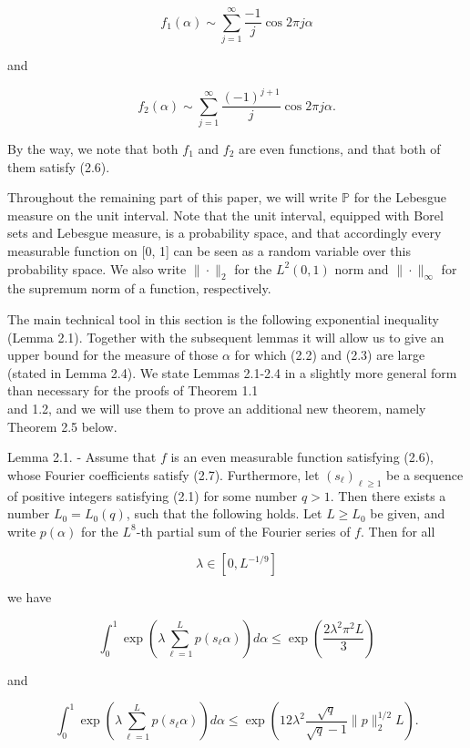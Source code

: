 \documentclass[10pt]{article}
\begin{document}
$$
f_{1}(\alpha) \sim \sum_{j=1}^{\infty} \frac{-1}{j} \cos 2 \pi j \alpha
$$

and

$$
f_{2}(\alpha) \sim \sum_{j=1}^{\infty} \frac{(-1)^{j+1}}{j} \cos 2 \pi j \alpha .
$$

By the way, we note that both $f_{1}$ and $f_{2}$ are even functions, and that both of them satisfy (2.6).

Throughout the remaining part of this paper, we will write $\mathbb{P}$ for the Lebesgue measure on the unit interval. Note that the unit interval, equipped with Borel sets and Lebesgue measure, is a probability space, and that accordingly every measurable function on [0, 1] can be seen as a random variable over this probability space. We also write $\|\cdot\|_{2}$ for the $L^{2}(0,1)$ norm and $\|\cdot\|_{\infty}$ for the supremum norm of a function, respectively.

The main technical tool in this section is the following exponential inequality (Lemma 2.1). Together with the subsequent lemmas it will allow us to give an upper bound for the measure of those $\alpha$ for which (2.2) and (2.3) are large (stated in Lemma 2.4). We state Lemmas 2.1-2.4 in a slightly more general form than necessary for the proofs of Theorem 1.1\\
and 1.2, and we will use them to prove an additional new theorem, namely Theorem 2.5 below.

Lemma 2.1. - Assume that $f$ is an even measurable function satisfying (2.6), whose Fourier coefficients satisfy (2.7). Furthermore, let $\left(s_{\ell}\right)_{\ell \geqslant 1}$ be a sequence of positive integers satisfying (2.1) for some number $q>1$. Then there exists a number $L_{0}=L_{0}(q)$, such that the following holds. Let $L \geqslant L_{0}$ be given, and write $p(\alpha)$ for the $L^{8}$-th partial sum of the Fourier series of $f$. Then for all


\begin{equation*}
\lambda \in\left[0, L^{-1 / 9}\right] \tag{2.8}
\end{equation*}


we have

$$
\int_{0}^{1} \exp \left(\lambda \sum_{\ell=1}^{L} p\left(s_{\ell} \alpha\right)\right) d \alpha \leqslant \exp \left(\frac{2 \lambda^{2} \pi^{2} L}{3}\right)
$$

and

$$
\int_{0}^{1} \exp \left(\lambda \sum_{\ell=1}^{L} p\left(s_{\ell} \alpha\right)\right) d \alpha \leqslant \exp \left(12 \lambda^{2} \frac{\sqrt{q}}{\sqrt{q}-1}\|p\|_{2}^{1 / 2} L\right) .
$$
\end{document}
